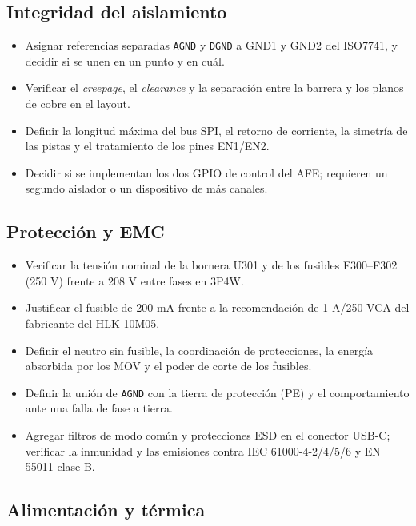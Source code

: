 \documentclass[11pt,a4paper]{article}
\begin{document}
\subsection{Integridad del aislamiento}

\begin{itemize}
  \item Asignar referencias separadas \texttt{AGND} y \texttt{DGND} a GND1
        y GND2 del ISO7741, y decidir si se unen en un punto y en cuál.
  \item Verificar el \emph{creepage}, el \emph{clearance} y la separación entre
        la barrera y los planos de cobre en el layout.
  \item Definir la longitud máxima del bus SPI, el retorno de corriente, la
        simetría de las pistas y el tratamiento de los pines EN1/EN2.
  \item Decidir si se implementan los dos GPIO de control del AFE; requieren un
        segundo aislador o un dispositivo de más canales.
\end{itemize}

\subsection{Protección y EMC}

\begin{itemize}
  \item Verificar la tensión nominal de la bornera U301 y de los fusibles
        F300--F302 (250 V) frente a 208 V entre fases en 3P4W.
  \item Justificar el fusible de 200 mA frente a la recomendación de 1 A/250 VCA
        del fabricante del HLK-10M05.
  \item Definir el neutro sin fusible, la coordinación de protecciones, la
        energía absorbida por los MOV y el poder de corte de los fusibles.
  \item Definir la unión de \texttt{AGND} con la tierra de protección (PE) y el
        comportamiento ante una falla de fase a tierra.
  \item Agregar filtros de modo común y protecciones ESD en el conector USB-C;
        verificar la inmunidad y las emisiones contra IEC 61000-4-2/4/5/6 y
        EN 55011 clase B.
\end{itemize}

\subsection{Alimentación y térmica}
\end{document}
